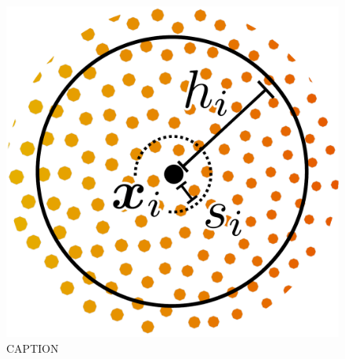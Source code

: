 \begin{figure}[t]
\centering
\includegraphics[scale=0.175]{assets/imgs/labfm-stencil-drawn_simple.pdf}
\caption{CAPTION}
\label{fig:labfm-stencil}
\end{figure}

